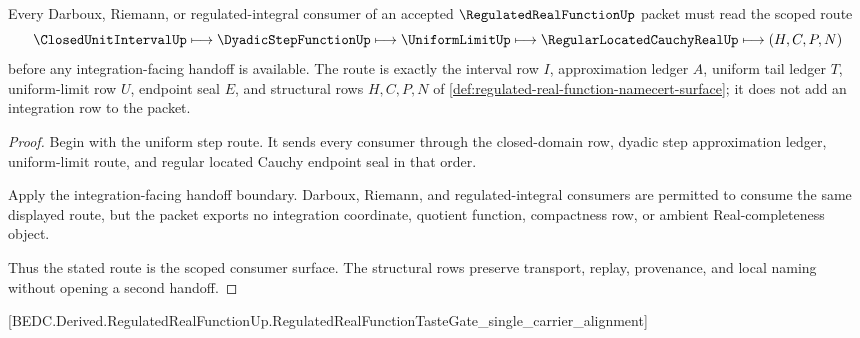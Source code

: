 \begin{theorem}
\label{thm:regulated-real-function-scope}
Every Darboux, Riemann, or regulated-integral consumer of an accepted $\RegulatedRealFunctionUp$ packet must read the scoped route
$$
\ClosedUnitIntervalUp \longmapsto \DyadicStepFunctionUp \longmapsto \UniformLimitUp \longmapsto \RegularLocatedCauchyRealUp \longmapsto (H,C,P,N)
$$
before any integration-facing handoff is available. The route is exactly the interval row $I$, approximation ledger $A$, uniform tail ledger $T$, uniform-limit row $U$, endpoint seal $E$, and structural rows $H,C,P,N$ of \autoref{def:regulated-real-function-namecert-surface}; it does not add an integration row to the packet.
\end{theorem}
\begin{proof}
Begin with the uniform step route. It sends every consumer through the closed-domain row, dyadic step approximation ledger, uniform-limit route, and regular located Cauchy endpoint seal in that order.

Apply the integration-facing handoff boundary. Darboux, Riemann, and regulated-integral consumers are permitted to consume the same displayed route, but the packet exports no integration coordinate, quotient function, compactness row, or ambient Real-completeness object.

Thus the stated route is the scoped consumer surface. The structural rows preserve transport, replay, provenance, and local naming without opening a second handoff.
\end{proof}

[BEDC.Derived.RegulatedRealFunctionUp.RegulatedRealFunctionTasteGate\_single\_carrier\_alignment]

